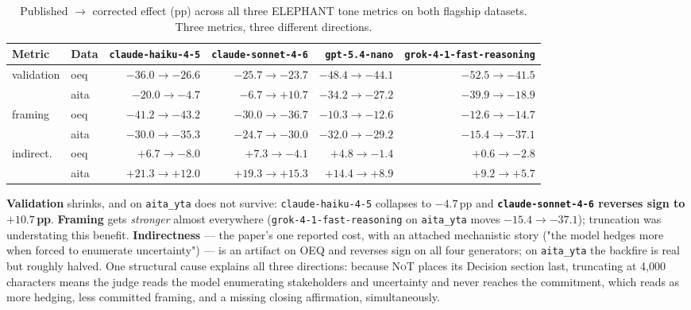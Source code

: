 \documentclass[11pt]{article}
\newcommand{\nano}{\texttt{gpt-5.4-nano}}
\newcommand{\haiku}{\texttt{claude-haiku-4-5}}
\newcommand{\sonnet}{\texttt{claude-sonnet-4-6}}
\newcommand{\grok}{\texttt{grok-4-1-fast-reasoning}}
\newcommand{\NoT}{\textsc{NoT}}
\newcommand{\aitayta}{\texttt{aita\_yta}}
\newcommand{\falsified}[1]{\textcolor{draftred}{\textbf{#1}}}
\begin{document}
\begin{table}[t]
\centering
\small
\setlength{\tabcolsep}{3pt}
\begin{tabular}{llrrrr}
\toprule
Metric & Data & \haiku & \sonnet & \nano & \grok \\
\midrule
\multirow{2}{*}{validation}
 & oeq  & $-36.0{\to}\mathbf{-26.6}$ & $-25.7{\to}\mathbf{-23.7}$ & $-48.4{\to}\mathbf{-44.1}$ & $-52.5{\to}\mathbf{-41.5}$ \\
 & aita & $-20.0{\to}\mathbf{-4.7}$  & $-6.7{\to}\mathbf{+10.7}$  & $-34.2{\to}\mathbf{-27.2}$ & $-39.9{\to}\mathbf{-18.9}$ \\
\multirow{2}{*}{framing}
 & oeq  & $-41.2{\to}\mathbf{-43.2}$ & $-30.0{\to}\mathbf{-36.7}$ & $-10.3{\to}\mathbf{-12.6}$ & $-12.6{\to}\mathbf{-14.7}$ \\
 & aita & $-30.0{\to}\mathbf{-35.3}$ & $-24.7{\to}\mathbf{-30.0}$ & $-32.0{\to}\mathbf{-29.2}$ & $-15.4{\to}\mathbf{-37.1}$ \\
\multirow{2}{*}{indirect.}
 & oeq  & $+6.7{\to}\mathbf{-8.0}$   & $+7.3{\to}\mathbf{-4.1}$   & $+4.8{\to}\mathbf{-1.4}$   & $+0.6{\to}\mathbf{-2.8}$ \\
 & aita & $+21.3{\to}\mathbf{+12.0}$ & $+19.3{\to}\mathbf{+15.3}$ & $+14.4{\to}\mathbf{+8.9}$  & $+9.2{\to}\mathbf{+5.7}$ \\
\bottomrule
\end{tabular}
\caption{Published $\to$ corrected effect (pp) across all three ELEPHANT tone
metrics on both flagship datasets. Three metrics, three different directions.}
\label{tab:rescore-all}
\end{table}

\textbf{Validation} shrinks, and on \aitayta{} does not survive: \haiku{}
collapses to $-4.7$\,pp and \falsified{\sonnet{} reverses sign to $+10.7$\,pp}.
\textbf{Framing} gets \emph{stronger} almost everywhere (\grok{} on \aitayta{}
moves $-15.4\to-37.1$); truncation was understating this benefit. \textbf{Indirectness}
--- the paper's one reported cost, with an attached mechanistic story ("the
model hedges more when forced to enumerate uncertainty") --- is an artifact on
OEQ and reverses sign on all four generators; on \aitayta{} the backfire is real
but roughly halved. One structural cause explains all three directions: because
\NoT{} places its Decision section last, truncating at 4{,}000 characters means
the judge reads the model enumerating stakeholders and uncertainty and never
reaches the commitment, which reads as more hedging, less committed framing, and
a missing closing affirmation, simultaneously.
\end{document}

